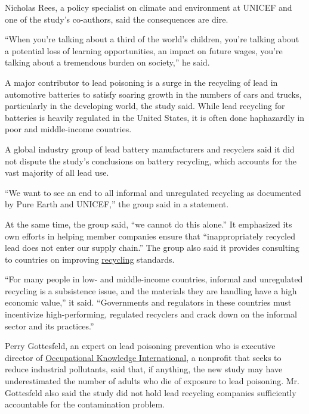 Nicholas Rees, a policy specialist on climate and environment at UNICEF
and one of the study's co-authors, said the consequences are dire.

``When you're talking about a third of the world's children, you're
talking about a potential loss of learning opportunities, an impact on
future wages, you're talking about a tremendous burden on society,'' he
said.

A major contributor to lead poisoning is a surge in the recycling of
lead in automotive batteries to satisfy soaring growth in the numbers of
cars and trucks, particularly in the developing world, the study said.
While lead recycling for batteries is heavily regulated in the United
States, it is often done haphazardly in poor and middle-income
countries.

A global industry group of lead battery manufacturers and recyclers said
it did not dispute the study's conclusions on battery recycling, which
accounts for the vast majority of all lead use.

``We want to see an end to all informal and unregulated recycling as
documented by Pure Earth and UNICEF,'' the group said in a statement.

At the same time, the group said, ``we cannot do this alone.'' It
emphasized its own efforts in helping member companies ensure that
``inappropriately recycled lead does not enter our supply chain.'' The
group also said it provides consulting to countries on improving
\href{https://www.nytimes3xbfgragh.onion/2019/12/08/world/asia/e-waste-thailand-southeast-asia.html?searchResultPosition=10}{recycling}
standards.

``For many people in low- and middle-income countries, informal and
unregulated recycling is a subsistence issue, and the materials they are
handling have a high economic value,'' it said. ``Governments and
regulators in these countries must incentivize high-performing,
regulated recyclers and crack down on the informal sector and its
practices.''

Perry Gottesfeld, an expert on lead poisoning prevention who is
executive director of
\href{http://www.okinternational.org/}{Occupational Knowledge
International}, a nonprofit that seeks to reduce industrial pollutants,
said that, if anything, the new study may have underestimated the number
of adults who die of exposure to lead poisoning. Mr. Gottesfeld also
said the study did not hold lead recycling companies sufficiently
accountable for the contamination problem.

